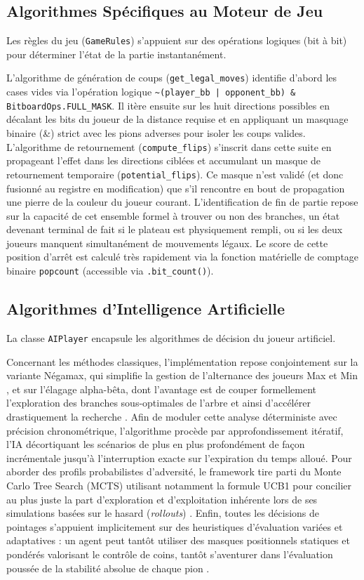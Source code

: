 \documentclass[a4paper]{article}
\begin{document}
\subsection{Algorithmes Spécifiques au Moteur de Jeu}
Les règles du jeu (\texttt{GameRules}) s'appuient sur des opérations logiques (bit à bit) pour déterminer
l'état de la partie instantanément.

L'algorithme de génération de coups (\texttt{get\_legal\_moves}) identifie d'abord les cases vides via l'opération logique \verb+~(player_bb | opponent_bb) & BitboardOps.FULL_MASK+. Il itère ensuite sur les huit directions possibles en décalant les bits du joueur de la distance requise et en appliquant un masquage binaire (\&) strict avec les pions adverses pour isoler les coups valides. 
L'algorithme de retournement (\texttt{compute\_flips}) s'inscrit dans cette suite en propageant l'effet dans les directions ciblées et accumulant un masque de retournement temporaire (\texttt{potential\_flips}). Ce masque n'est validé (et donc fusionné au registre en modification) que s'il rencontre en bout de propagation une pierre de la couleur du joueur courant. L'identification de fin de partie repose sur la capacité de cet ensemble formel à trouver ou non des branches, un état devenant terminal de fait si le plateau est physiquement rempli, ou si les deux joueurs manquent simultanément de mouvements légaux. Le score de cette position d'arrêt est calculé très rapidement via la fonction matérielle de comptage binaire \texttt{popcount} (accessible via \texttt{.bit\_count()}).


\subsection{Algorithmes d'Intelligence Artificielle}
La classe \texttt{AIPlayer} encapsule les algorithmes de décision du joueur artificiel.

Concernant les méthodes classiques, l'implémentation repose conjointement sur la variante Négamax, qui simplifie la gestion de l'alternance des joueurs Max et Min \cite{Knuth1997}, et sur l'élagage alpha-bêta, dont l'avantage est de couper formellement l'exploration des branches sous-optimales de l'arbre et ainsi d'accélérer drastiquement la recherche \cite{Takizawa2024, Knuth1997}. Afin de moduler cette analyse déterministe avec précision chronométrique, l'algorithme procède par approfondissement itératif, l'IA décortiquant les scénarios de plus en plus profondément de façon incrémentale jusqu'à l'interruption exacte sur l'expiration du temps alloué. 
Pour aborder des profils probabilistes d'adversité, le framework tire parti du Monte Carlo Tree Search (MCTS) utilisant notamment la formule UCB1 pour concilier au plus juste la part d'exploration et d'exploitation inhérente lors de ses simulations basées sur le hasard (\textit{rollouts}) \cite{Browne2012}. Enfin, toutes les décisions de pointages s'appuient implicitement sur des heuristiques d'évaluation variées et adaptatives : un agent peut tantôt utiliser des masques positionnels statiques et pondérés valorisant le contrôle de coins, tantôt s'aventurer dans l'évaluation poussée de la stabilité absolue de chaque pion \cite{Rosenbloom1982}.
\end{document}
